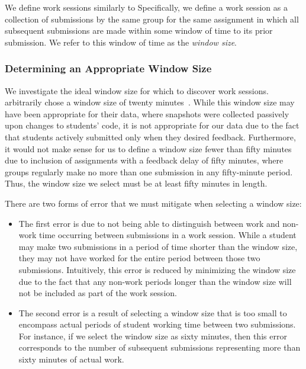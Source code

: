 We define work sessions similarly to \spacco[.]{} Specifically, we define a
work session as a collection of submissions by the same group for the same
assignment in which all subsequent submissions are made within some window of
time to its prior submission. We refer to this window of time as the
\emph{window size}.

\subsubsection{Determining an Appropriate Window Size}

We investigate the ideal window size for which to discover work
sessions. \spacco{} arbitrarily chose a window size of twenty
minutes~\cite{Spacco:2013:TIP:2462476.2465594}. While this window size may have
been appropriate for their data, where snapshots were collected passively upon
changes to students' code, it is not appropriate for our data due to the fact
that students actively submitted only when they desired feedback. Furthermore,
it would not make sense for us to define a window size fewer than fifty minutes
due to inclusion of assignments with a feedback delay of fifty minutes, where
groups regularly make no more than one submission in any fifty-minute
period. Thus, the window size we select must be at least fifty minutes in
length.

There are two forms of error that we must mitigate when selecting a window
size:

\begin{itemize}
\item The first error is due to not being able to distinguish between work and
  non-work time occurring between submissions in a work session. While a
  student may make two submissions in a period of time shorter than the window
  size, they may not have worked for the entire period between those two
  submissions. Intuitively, this error is reduced by minimizing the window size
  due to the fact that any non-work periods longer than the window size will
  not be included as part of the work session.
\item The second error is a result of selecting a window size that is too small
  to encompass actual periods of student working time between two submissions.
  For instance, if we select the window size as sixty minutes, then this error
  corresponds to the number of subsequent submissions representing more than
  sixty minutes of actual work.
\end{itemize}

